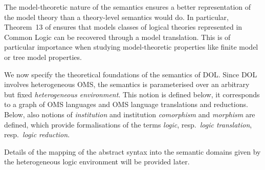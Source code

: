 \documentclass[10pt,%
\ifpretendfinal
final%
\else
draft%
\fi,
]{scrreprt}
\newcommand*{\termref}[1]{\textit{#1}}
\newcommand*{\institutionsOnly}{\bfseries\itshape}
\newcommand*{\syntax}[1]{\texttt{#1}}
\begin{document}
The model-theoretic nature of the semantics ensures a better representation
of the model theory than a theory-level semantics would do. In particular,
Theorem~13 of \cite{ThreeSemantics} ensures that models classes of logical 
theories represented in Common Logic can be recovered through a model
translation. This is of particular importance when studying model-theoretic
properties like finite model or tree model properties.




We now specify the theoretical foundations of the semantics
of DOL. Since DOL involves
heterogeneous OMS, the semantics is parameterised over an
arbitrary but fixed \emph{heterogeneous environment}.  This
notion is defined below, it corresponds to a graph of OMS
languages and OMS language translations and reductions. Below, also notions of
\emph{institution} and institution \emph{comorphism} and \emph{morphism} are defined, which
provide formalisations of the terms \termref{logic},
resp.\ \termref{logic translation}, resp.\  \termref{logic reduction}. 


Details of the mapping of the abstract syntax into the semantic
domains given by the heterogeneous logic environment will be provided later.


\end{document}
